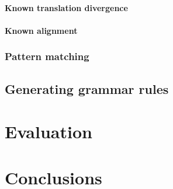 \documentclass[11pt]{article}
\begin{document}
\paragraph{Known translation divergence}

\paragraph{Known alignment}


\subsubsection{Pattern matching}

\subsection{Generating grammar rules}

\section{Evaluation} \label{evaluation}

\section{Conclusions} \label{conclusions}

%
%
\end{document}
